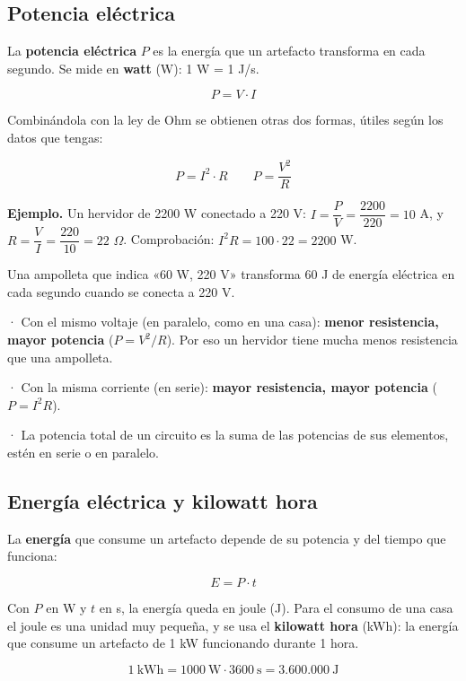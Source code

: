 \subsection{Potencia eléctrica}
La \textbf{potencia eléctrica} $P$ es la energía que un artefacto transforma en cada segundo. Se mide en \textbf{watt} (W): 1 W = 1 J/s.

 \[ P = V\cdot I \] 

Combinándola con la ley de Ohm se obtienen otras dos formas, útiles según los datos que tengas:

 \[ P = I^2\cdot R \qquad P = \dfrac{V^2}{R} \] 

\textbf{Ejemplo.} Un hervidor de 2200 W conectado a 220 V: $I = \dfrac{P}{V} = \dfrac{2200}{220} = 10$ A, y $R = \dfrac{V}{I} = \dfrac{220}{10} = 22$ \ensuremath{\Omega}. Comprobación: $I^2 R = 100\cdot 22 = 2200$ W.

  
\begin{clave} Una ampolleta que indica «60 W, 220 V» transforma 60 J de energía eléctrica en cada segundo cuando se conecta a 220 V.\end{clave}
 
\begin{clave}[{Recuerda}] · Con el mismo voltaje (en paralelo, como en una casa): \textbf{menor resistencia, mayor potencia} ($P = V^2/R$). Por eso un hervidor tiene mucha menos resistencia que una ampolleta.\par · Con la misma corriente (en serie): \textbf{mayor resistencia, mayor potencia} ($P = I^2R$).\par · La potencia total de un circuito es la suma de las potencias de sus elementos, estén en serie o en paralelo.\end{clave}
\subsection{Energía eléctrica y kilowatt hora}
La \textbf{energía} que consume un artefacto depende de su potencia y del tiempo que funciona:

 \[ E = P\cdot t \] 

Con $P$ en W y $t$ en s, la energía queda en joule (J). Para el consumo de una casa el joule es una unidad muy pequeña, y se usa el \textbf{kilowatt hora} (kWh): la energía que consume un artefacto de 1 kW funcionando durante 1 hora.

 \[ 1\ \text{kWh} = 1000\ \text{W}\cdot 3600\ \text{s} = 3.600.000\ \text{J} \] 

